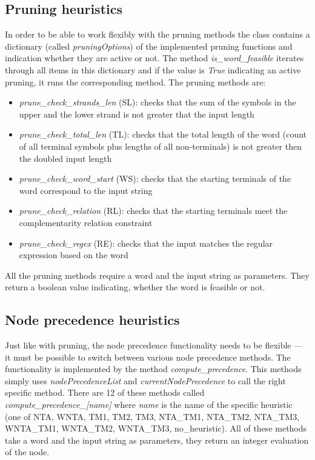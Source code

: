 \subsection{Pruning heuristics}
In order to be able to work flexibly with the pruning methods the class contains a dictionary (called \textit{pruningOptions}) of the implemented pruning functions and indication whether they are active or not. The method \textit{is\_word\_feasible} iterates through all items in this dictionary and if the value is \textit{True} indicating an active pruning, it runs the corresponding method.
The pruning methods are:
\begin{itemize}
  \item{\textit{prune\_check\_strands\_len} (SL): checks that the sum of the symbols in the upper and the lower strand is not greater that the input length}

  \item{\textit{prune\_check\_total\_len} (TL): checks that the total length of the word (count of all terminal symbols plus lengths of all non-terminals) is not greater then the doubled input length}

  \item{\textit{prune\_check\_word\_start} (WS): checks that the starting terminals of the word correspond to the input string}

  \item{\textit{prune\_check\_relation} (RL): checks that the starting terminals meet the complementarity relation constraint}

  \item{\textit{prune\_check\_regex} (RE): checks that the input matches the regular expression based on the word}
\end{itemize}

All the pruning methods require a word and the input string as parameters. They return a boolean value indicating, whether the word is feasible or not.

\subsection{Node precedence heuristics}
Just like with pruning, the node precedence functionality needs to be flexible --- it must be possible to switch between various node precedence methods. The functionality is implemented by the method \textit{compute\_precedence}. This methods simply uses \textit{nodePrecedenceList} and \textit{currentNodePrecedence} to call the right specific method.
There are 12 of these methods called \textit{compute\_precedence\_[name]} where \textit{name} is the name of the specific heuristic (one of NTA, WNTA, TM1, TM2, TM3, NTA\_TM1, NTA\_TM2, NTA\_TM3, WNTA\_TM1, WNTA\_TM2, WNTA\_TM3, no\_heuristic). All of these methods take a word and the input string as parameters, they return an integer evaluation of the node.

